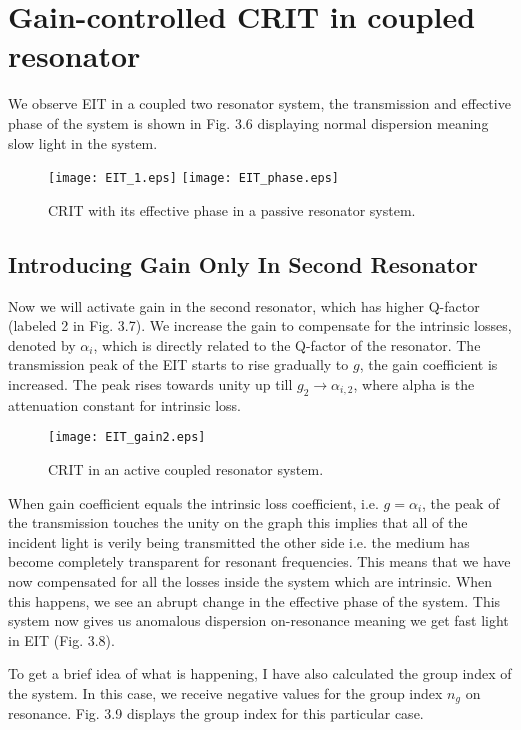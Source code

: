 \section{Gain-controlled CRIT in coupled resonator}
We observe EIT in a coupled two resonator system, the transmission and effective phase of the system is shown in Fig. 3.6 displaying normal dispersion meaning slow light in the system.

\begin{figure}[h]
\texttt{[image: EIT\_1.eps]}
\texttt{[image: EIT\_phase.eps]}
\caption{CRIT with its effective phase in a passive resonator system.}
\end{figure}

\subsection{Introducing Gain Only In Second Resonator}
Now we will activate gain in the second resonator, which has higher Q-factor (labeled 2 in Fig. 3.7). We increase the gain to compensate for the intrinsic losses, denoted by $\alpha_{i}$, which is directly related to the Q-factor of the resonator. The transmission peak of the EIT starts to rise gradually to $g$, the gain coefficient is increased. The peak rises towards unity up till $g_{2} \to \alpha_{i,2}$, where alpha is the attenuation constant for intrinsic loss. 

\begin{figure}[h]
\centering
\texttt{[image: EIT\_gain2.eps]}
\caption{CRIT in an active coupled resonator system.}
\end{figure}

When gain coefficient equals the intrinsic loss coefficient, i.e. $g = \alpha_{i}$, the peak of the transmission touches the unity on the graph this implies that all of the incident light is verily being transmitted the other side i.e. the medium has become completely transparent for resonant frequencies. This means that we have now compensated for all the losses inside the system which are intrinsic. When this happens, we see an abrupt change in the effective phase of the system. This system now gives us anomalous dispersion on-resonance meaning we get fast light in EIT (Fig. 3.8). 

To get a brief idea of what is happening, I have also calculated the group index of the system. In this case, we receive negative values for the group index $n_{g}$ on resonance. Fig. 3.9 displays the group index for this particular case.


